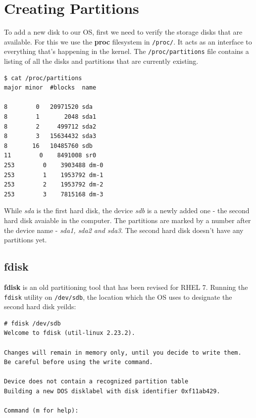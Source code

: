 	\section{Creating Partitions}
To add a new disk to our OS, first we need to verify the storage disks that are available. For this we use the \textbf{proc} filesystem in \verb|/proc/|. It acts as an interface to everything that's happening in the kernel. The \verb|/proc/partitions| file contains a listing of all the disks and partitions that are currently existing.

\vspace{-15pt}
\begin{verbatim}
$ cat /proc/partitions
major minor  #blocks  name

8        0   20971520 sda
8        1       2048 sda1
8        2     499712 sda2
8        3   15634432 sda3
8       16   10485760 sdb
11        0    8491008 sr0
253        0    3903488 dm-0
253        1    1953792 dm-1
253        2    1953792 dm-2
253        3    7815168 dm-3
\end{verbatim}
\vspace{-10pt}

\noindent
While \textit{sda} is the first hard disk, the device \textit{sdb} is a newly added one - the second hard disk avaiable in the computer. The partitions are marked by a number after the device name - \textit{sda1, sda2 and sda3}. The second hard disk doesn't have any partitions yet.

\subsection{fdisk}
\textbf{fdisk} is an old partitioning tool that has been revised for RHEL 7. Running the \verb|fdisk| utility on \verb|/dev/sdb|, the location which the OS uses to designate the second hard disk yeilds:

\vspace{-15pt}
\begin{verbatim}
# fdisk /dev/sdb
Welcome to fdisk (util-linux 2.23.2).

Changes will remain in memory only, until you decide to write them.
Be careful before using the write command.

Device does not contain a recognized partition table
Building a new DOS disklabel with disk identifier 0xf11ab429.

Command (m for help): 
\end{verbatim}
\vspace{-10pt}

